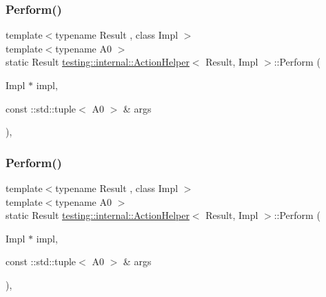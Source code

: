 \subsubsection{\texorpdfstring{Perform()}{Perform()}\hspace{0.1cm}{\footnotesize\ttfamily [3/33]}}
{\footnotesize\ttfamily template$<$typename Result , class Impl $>$ \\
template$<$typename A0 $>$ \\
static Result \mbox{\hyperlink{classtesting_1_1internal_1_1_action_helper}{testing\+::internal\+::\+Action\+Helper}}$<$ Result, Impl $>$\+::Perform (\begin{DoxyParamCaption}\item[{Impl $\ast$}]{impl,  }\item[{const \+::std\+::tuple$<$ A0 $>$ \&}]{args }\end{DoxyParamCaption})\hspace{0.3cm}{\ttfamily [inline]}, {\ttfamily [static]}}

\mbox{\label{classtesting_1_1internal_1_1_action_helper_aa02169413facf7b60dd6d63bdeacb389}} 
\subsubsection{\texorpdfstring{Perform()}{Perform()}\hspace{0.1cm}{\footnotesize\ttfamily [4/33]}}
{\footnotesize\ttfamily template$<$typename Result , class Impl $>$ \\
template$<$typename A0 $>$ \\
static Result \mbox{\hyperlink{classtesting_1_1internal_1_1_action_helper}{testing\+::internal\+::\+Action\+Helper}}$<$ Result, Impl $>$\+::Perform (\begin{DoxyParamCaption}\item[{Impl $\ast$}]{impl,  }\item[{const \+::std\+::tuple$<$ A0 $>$ \&}]{args }\end{DoxyParamCaption})\hspace{0.3cm}{\ttfamily [inline]}, {\ttfamily [static]}}

\mbox{\label{classtesting_1_1internal_1_1_action_helper_a71147b30081c44d7d2c776c1781b797c}} 
